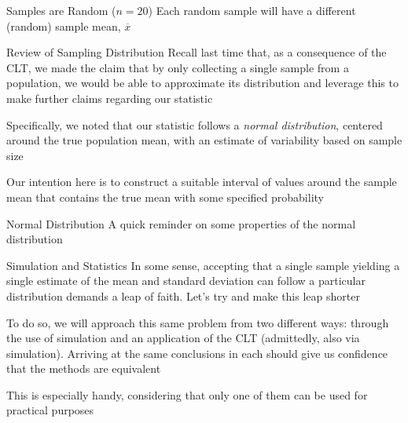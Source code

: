 \documentclass{beamer}
\begin{document}
\begin{frame}{Samples are Random ($n = 20$)}
Each random sample will have a different (random) sample mean, $\overline{x}$

\end{frame}

\begin{frame}{Review of Sampling Distribution}
Recall last time that, as a consequence of the CLT, we made the claim that by only collecting a single sample from a population, we would be able to approximate its distribution and leverage this to make further claims regarding our statistic \newline \vspace{3mm}

Specifically, we noted that our statistic follows a \textit{normal distribution}, centered around the true population mean, with an estimate of variability based on sample size \newline \vspace{3mm}

Our intention here is to construct a suitable interval of values around the sample mean that contains the true mean with some specified probability

\end{frame}

\begin{frame}{Normal Distribution}
A quick reminder on some properties of the normal distribution

\end{frame}

\begin{frame}{Simulation and Statistics}
In some sense, accepting that a single sample yielding a single estimate of the mean and standard deviation can follow a particular distribution demands a leap of faith. Let's try and make this leap shorter \\ \vspace{5mm}

To do so, we will approach this same problem from two different ways: through the use of simulation and an application of the CLT (admittedly, also via simulation). Arriving at the same conclusions in each should give us confidence that the methods are equivalent \\ \vspace{5mm}

This is especially handy, considering that only one of them can be used for practical purposes
\end{frame}
\end{document}
